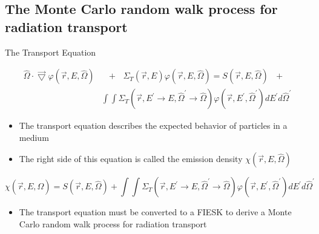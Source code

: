 \documentclass{beamer}
\begin{document}

\subsection{The Monte Carlo random walk process for radiation transport}
\begin{frame}{The Transport Equation}

\begin{align}
  \hat{\Omega} \cdot \vec{\bigtriangledown} \varphi(\vec{r},E,\hat{\Omega})
    &\text{ }+\text{ } \Sigma_T(\vec{r},E) \varphi(\vec{r},E,\hat{\Omega}) = 
    S(\vec{r},E,\hat{\Omega}) \text{ }+\text{ } \nonumber \\
    & \int\int \Sigma_T(\vec{r},E^{'} \to E,\hat{\Omega}^{'} \to \hat{\Omega})
    \varphi(\vec{r},E^{'},\hat{\Omega}^{'}) dE^{'}d\hat{\Omega}^{'} \nonumber
\end{align}

  \begin{itemize}
    \item The transport equation describes the expected behavior of particles
      in a medium
      \medskip
    \item The right side of this equation is called the emission density 
      $\chi(\vec{r},E,\hat{\Omega})$
  \end{itemize}
  \medskip
  \begin{equation*}
    \chi(\vec{r},E,\hat{\Omega}) = S(\vec{r},E,\hat{\Omega}) +
    \int\int \Sigma_T(\vec{r},E^{'} \to E,\hat{\Omega}^{'} \to \hat{\Omega})
    \varphi(\vec{r},E^{'},\hat{\Omega}^{'}) dE^{'}d\hat{\Omega}^{'}
  \end{equation*}
  
  \begin{itemize}
    \item The transport equation must be converted to a FIESK to derive a 
      Monte Carlo random walk process for radiation transport
  \end{itemize}

\end{frame}

\end{document}
